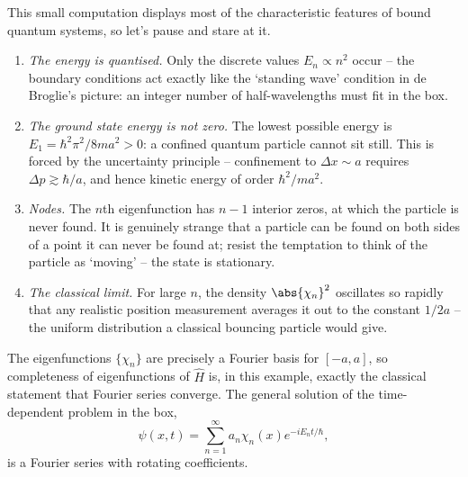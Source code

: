 This small computation displays most of the characteristic features of bound quantum systems, so let's pause and stare at it.

\begin{enumerate}[label=(\roman*)]
    \item \emph{The energy is quantised.} Only the discrete values $E_n \propto n^2$ occur -- the boundary conditions act exactly like the `standing wave' condition in de Broglie's picture: an integer number of half-wavelengths must fit in the box.
    \item \emph{The ground state energy is not zero.} The lowest possible energy is $E_1 = \hbar^2\pi^2/8ma^2 > 0$: a confined quantum particle cannot sit still. This is forced by the uncertainty principle -- confinement to $\Delta x \sim a$ requires $\Delta p \gtrsim \hbar/a$, and hence kinetic energy of order $\hbar^2 / m a^2$.
    \item \emph{Nodes.} The $n$th eigenfunction has $n - 1$ interior zeros, at which the particle is never found. It is genuinely strange that a particle can be found on both sides of a point it can never be found at; resist the temptation to think of the particle as `moving' -- the state is stationary.
    \item \emph{The classical limit.} For large $n$, the density $\abs{\chi_n}^2$ oscillates so rapidly that any realistic position measurement averages it out to the constant $1/2a$ -- the uniform distribution a classical bouncing particle would give.
\end{enumerate}

\begin{remark}
    The eigenfunctions $\{\chi_n\}$ are precisely a Fourier basis for $[-a, a]$, so completeness of eigenfunctions of $\hat{H}$ is, in this example, exactly the classical statement that Fourier series converge. The general solution of the time-dependent problem in the box,
    $$
    \psi(x,t) = \sum_{n=1}^\infty a_n \chi_n(x) e^{-iE_n t/\hbar},
    $$
    is a Fourier series with rotating coefficients.
\end{remark}

